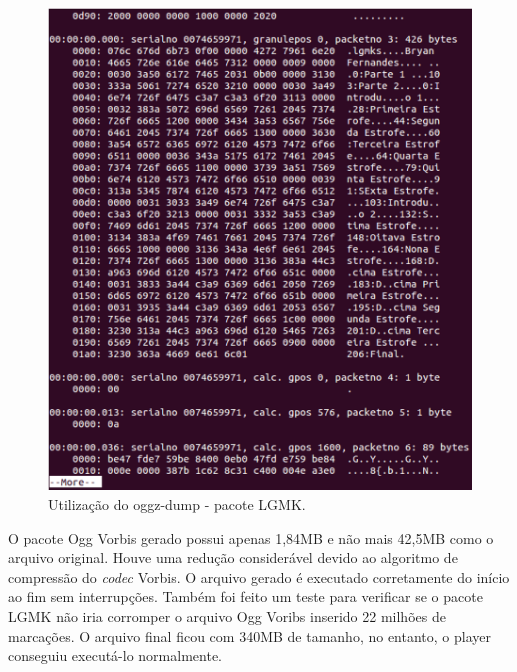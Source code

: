  \begin{figure}[ht]
	\centering
		\includegraphics[keepaspectratio=true,scale=0.3]{figuras/hnblgmkogg.eps}
	\caption{Utilização do oggz-dump - pacote LGMK.}
	\label{lgmk}
\end{figure}

O pacote Ogg Vorbis gerado possui apenas 1,84MB e não mais 42,5MB como o arquivo original. Houve uma redução considerável devido ao algoritmo de compressão do \textit{codec} Vorbis. O arquivo gerado é executado corretamente do início ao fim sem interrupções. Também foi feito um teste para verificar se o pacote LGMK não iria corromper o arquivo Ogg Voribs inserido 22 milhões de marcações. O arquivo final ficou com 340MB de tamanho, no entanto, o player conseguiu executá-lo normalmente.


%




